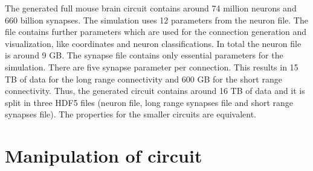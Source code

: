The generated full mouse brain circuit contains around 74 million neurons and 660 billion synapses.
The simulation uses 12 parameters from the neuron file.
The file contains further parameters which are used for the connection generation and visualization,
like coordinates and neuron classifications. In total the neuron file is around 9 GB.
The synapse file contains only essential parameters for the simulation.
There are five synapse parameter per connection. This results in 15 TB of data
for the long range connectivity and 600 GB for the short range connectivity.
Thus, the generated circuit contains around 16 TB of data and it is split in three HDF5
files (neuron file, long range synapses file and short range synapses file).
The properties for the smaller circuits are equivalent.

\section{Manipulation of circuit}

